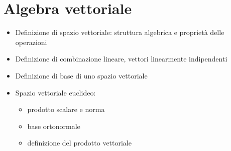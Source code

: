 \documentclass[letterpaper,10pt,english]{jupyterBook}
\begin{document}
\chapter{Algebra vettoriale}
\label{\detokenize{ch/algebra/vector-algebra:algebra-vettoriale}}\label{\detokenize{ch/algebra/vector-algebra:math-hs-algebra-vector}}\label{\detokenize{ch/algebra/vector-algebra::doc}}\begin{itemize}
\item {} 
\sphinxAtStartPar
Definizione di spazio vettoriale: struttura algebrica e proprietà delle operazioni

\item {} 
\sphinxAtStartPar
Definizione di combinazione lineare, vettori linearmente indipendenti

\item {} 
\sphinxAtStartPar
Definizione di base di uno spazio vettoriale

\item {} 
\sphinxAtStartPar
Spazio vettoriale euclideo:
\begin{itemize}
\item {} 
\sphinxAtStartPar
prodotto scalare e norma

\item {} 
\sphinxAtStartPar
base ortonormale

\item {} 
\sphinxAtStartPar
definizione del prodotto vettoriale

\end{itemize}

\end{itemize}

\sphinxstepscope
\end{document}
